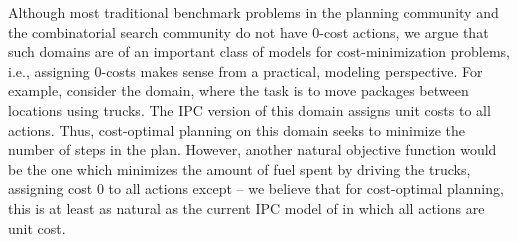
Although most traditional benchmark problems in the planning community and the combinatorial search community do not have 0-cost actions,
we argue that such domains are of an important class of models for cost-minimization problems, i.e.,
assigning 0-costs makes sense from a practical, modeling perspective.
For example, consider the  domain, where the task is to move packages between locations using trucks.
The IPC version of this domain assigns unit costs to all actions. Thus, cost-optimal planning on this domain seeks to minimize the number of steps in the plan.
However, another natural objective function would be the one which minimizes the amount of fuel spent by driving the trucks,
assigning cost 0 to all actions except  -- we believe that for cost-optimal planning, this is at least as natural as the current IPC model of  in which all actions are unit cost.


